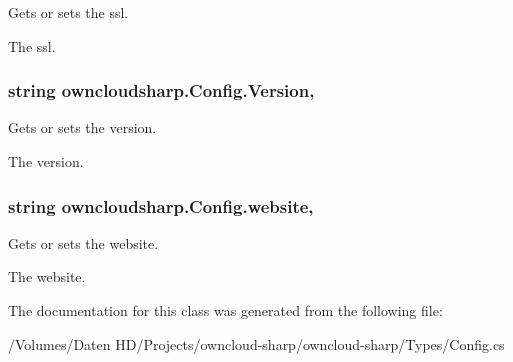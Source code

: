 Gets or sets the ssl. 

The ssl.\hypertarget{classowncloudsharp_1_1_config_ae1b02a97378b82d7d99b4f7467456aec}{}
\subsubsection[{Version}]{\setlength{\rightskip}{0pt plus 5cm}string owncloudsharp.\+Config.\+Version\hspace{0.3cm}{\ttfamily [get]}, {\ttfamily [set]}}\label{classowncloudsharp_1_1_config_ae1b02a97378b82d7d99b4f7467456aec}


Gets or sets the version. 

The version.\hypertarget{classowncloudsharp_1_1_config_ab72c927b798b0924e5e099d1557f9dc0}{}
\subsubsection[{website}]{\setlength{\rightskip}{0pt plus 5cm}string owncloudsharp.\+Config.\+website\hspace{0.3cm}{\ttfamily [get]}, {\ttfamily [set]}}\label{classowncloudsharp_1_1_config_ab72c927b798b0924e5e099d1557f9dc0}


Gets or sets the website. 

The website.

The documentation for this class was generated from the following file\+:\begin{DoxyCompactItemize}
\item 
/\+Volumes/\+Daten H\+D/\+Projects/owncloud-\/sharp/owncloud-\/sharp/\+Types/Config.\+cs\end{DoxyCompactItemize}
